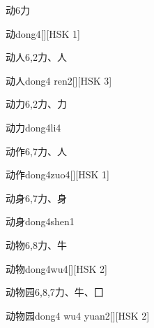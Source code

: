 \begin{entry}{动}{6}{⼒}
  \begin{phonetics}{动}{dong4}[][HSK 1]
  \end{phonetics}
\end{entry}

\begin{entry}{动人}{6,2}{⼒、⼈}
  \begin{phonetics}{动人}{dong4 ren2}[][HSK 3]
  \end{phonetics}
\end{entry}

\begin{entry}{动力}{6,2}{⼒、⼒}
  \begin{phonetics}{动力}{dong4li4}
  \end{phonetics}
\end{entry}

\begin{entry}{动作}{6,7}{⼒、⼈}
  \begin{phonetics}{动作}{dong4zuo4}[][HSK 1]
  \end{phonetics}
\end{entry}

\begin{entry}{动身}{6,7}{⼒、⾝}
  \begin{phonetics}{动身}{dong4shen1}
  \end{phonetics}
\end{entry}

\begin{entry}{动物}{6,8}{⼒、⽜}
  \begin{phonetics}{动物}{dong4wu4}[][HSK 2]
  \end{phonetics}
\end{entry}

\begin{entry}{动物园}{6,8,7}{⼒、⽜、⼞}
  \begin{phonetics}{动物园}{dong4 wu4 yuan2}[][HSK 2]
  \end{phonetics}
\end{entry}

